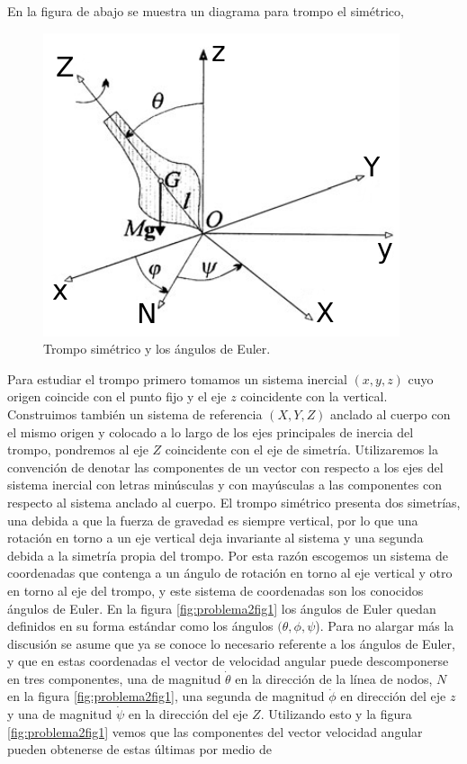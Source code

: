 \documentclass[a4paper,10pt]{article}
\numberwithin{equation}{section}
\begin{document}
En la figura de abajo se muestra un diagrama para trompo el simétrico, 

\begin{figure}[H]
 \center 
 \includegraphics[scale=0.5]{problema2fig1}
 \caption{Trompo simétrico y los ángulos de Euler.}
 \label{fig:problema2fig1}
\end{figure}

Para estudiar el trompo primero tomamos un sistema inercial $(x,y,z)$ cuyo origen 
coincide con el punto fijo y el eje $z$ coincidente con la vertical. Construimos también 
un sistema de referencia $(X,Y,Z)$ anclado al cuerpo con el mismo origen y colocado 
a lo largo de los ejes principales de inercia del trompo, pondremos al eje $Z$ coincidente 
con el eje de simetría. Utilizaremos la convención de denotar las componentes de un 
vector con respecto a los ejes del sistema inercial con letras minúsculas 
y con mayúsculas a las componentes con respecto al sistema anclado al cuerpo. El trompo 
simétrico presenta dos simetrías, una debida a que la fuerza de gravedad 
es siempre vertical, por lo que una rotación en torno a un eje vertical deja invariante 
al sistema y una segunda debida a la simetría propia del trompo. Por esta razón escogemos 
un sistema de coordenadas que contenga a un ángulo de rotación en torno al eje vertical 
y otro en torno al eje del trompo, y este sistema de coordenadas son los conocidos 
ángulos de Euler. En la figura \eqref{fig:problema2fig1} los ángulos de Euler quedan 
definidos en su forma estándar como los ángulos $(\theta,\phi,\psi$). Para no alargar 
más la discusión se asume que ya se conoce lo necesario referente a los ángulos 
de Euler, y que en estas coordenadas el vector de velocidad angular puede descomponerse 
en tres componentes, una de magnitud $\dot{\theta}$ en la dirección de la línea de 
nodos, $N$ en la figura \eqref{fig:problema2fig1}, una segunda de magnitud $\dot{\phi}$ en
dirección del eje $z$ y una de magnitud $\dot{\psi}$ en la dirección del eje $Z$. Utilizando 
esto y la figura \eqref{fig:problema2fig1} vemos que las componentes del vector 
velocidad angular pueden obtenerse de estas últimas por medio de 
\end{document}
